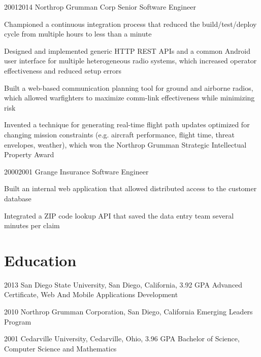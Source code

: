 \documentclass{article}
\begin{document}
\job
  {2001}{2014}
  {Northrop Grumman Corp}
  {Senior Software Engineer}
  {\begin{achievements}
    \item Championed a continuous integration process that reduced the build/test/deploy cycle from multiple hours to less than a minute
    \item Designed and implemented generic HTTP REST APIs and a common Android user interface for multiple heterogeneous radio systems, which increased operator effectiveness and reduced setup errors
    \item Built a web-based communication planning tool for ground and airborne radios, which allowed warfighters to maximize comm-link effectiveness while minimizing risk
    \item Invented a technique for generating real-time flight path updates optimized for changing mission constraints (e.g. aircraft performance, flight time, threat envelopes, weather), which won the Northrop Grumman Strategic Intellectual Property Award
  \end{achievements}}

\job
  {2000}{2001}
  {Grange Insurance}
  {Software Engineer}
  {\begin{achievements}
    \item Built an internal web application that allowed distributed access to the customer database
    \item Integrated a ZIP code lookup API that saved the data entry team several minutes per claim
  \end{achievements}}


\section{Education}

\education
  {2013}
  {San Diego State University, San Diego, California, 3.92 GPA}
  {Advanced Certificate, Web And Mobile Applications Development}

\education
  {2010}
  {Northrop Grumman Corporation, San Diego, California}
  {Emerging Leaders Program}

\education
  {2001}
  {Cedarville University, Cedarville, Ohio, 3.96 GPA}
  {Bachelor of Science, Computer Science and Mathematics}


\section{}

\credits
\end{document}
